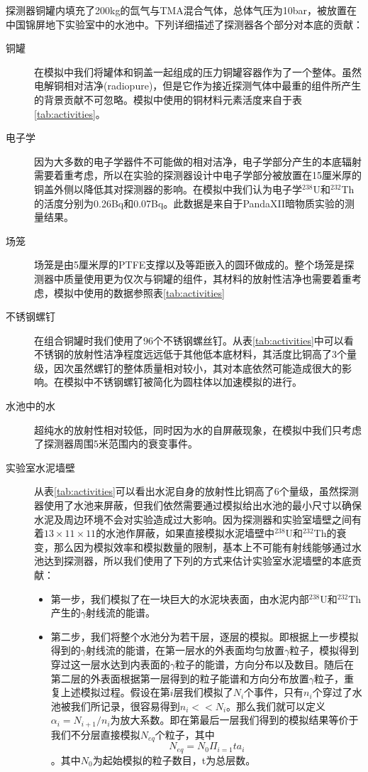 探测器铜罐内填充了200kg的氙气与TMA混合气体，总体气压为10bar，被放置在中国锦屏地下实验室中的水池中。下列详细描述了探测器各个部分对本底的贡献：

\begin{description}
    \item[铜罐] 在模拟中我们将罐体和铜盖一起组成的压力铜罐容器作为了一个整体。虽然电解铜相对洁净(radiopure)，但是它作为接近探测气体中最重的组件所产生的背景贡献不可忽略。模拟中使用的铜材料元素活度来自于表\ref{tab:activities}。
    \item[电子学] 因为大多数的电子学器件不可能做的相对洁净，电子学部分产生的本底辐射需要着重考虑，所以在实验的探测器设计中电子学部分被放置在15厘米厚的铜盖外侧以降低其对探测器的影响。在模拟中我们认为电子学$^{238}$U和$^{232}$Th的活度分别为0.26Bq和0.07Bq。此数据是来自于PandaXII暗物质实验的测量结果。
    \item[场笼]场笼是由5厘米厚的PTFE支撑以及等距嵌入的圆环做成的。整个场笼是探测器中质量使用更为仅次与铜罐的组件，其材料的放射性洁净也需要着重考虑，模拟中使用的数据参照表\ref{tab:activities}
    \item[不锈钢螺钉]在组合铜罐时我们使用了96个不锈钢螺丝钉。从表\ref{tab:activities}中可以看不锈钢的放射性洁净程度远远低于其他低本底材料，其活度比铜高了3个量级，因次虽然螺钉的整体质量相对较小，其对本底依然可能造成很大的影响。在模拟中不锈钢螺钉被简化为圆柱体以加速模拟的进行。
    \item[水池中的水]超纯水的放射性相对较低，同时因为水的自屏蔽现象，在模拟中我们只考虑了探测器周围5米范围内的衰变事件。
    \item[实验室水泥墙壁]从表\ref{tab:activities}可以看出水泥自身的放射性比铜高了6个量级，虽然探测器使用了水池来屏蔽，但我们依然需要通过模拟给出水池的最小尺寸以确保水泥及周边环境不会对实验造成过大影响。因为探测器和实验室墙壁之间有着$13\times11\times11$的水池作屏蔽，如果直接模拟水泥墙壁中$^{238}$U和$^{232}$Th的衰变，那么因为模拟效率和模拟数量的限制，基本上不可能有射线能够通过水池达到探测器，所以我们使用了下列的方式来估计实验室水泥墙壁的本底贡献：
    \begin{itemize}
        \item 第一步，我们模拟了在一块巨大的水泥块表面，由水泥内部$^{238}$U和$^{232}$Th产生的$\gamma$射线流的能谱。
        \item 第二步，我们将整个水池分为若干层，逐层的模拟。即根据上一步模拟得到的$\gamma$射线流的能谱，在第一层水的外表面均匀放置$\gamma$粒子，模拟得到穿过这一层水达到内表面的$\gamma$粒子的能谱，方向分布以及数目。随后在第二层的外表面根据第一层得到的粒子能谱和方向分布放置$\gamma$粒子，重复上述模拟过程。假设在第$i$层我们模拟了$N_i$个事件，只有$n_i$个穿过了水池被我们所记录，很容易得到$n_i<<N_i$。那么我们就可以定义$\alpha_i=N_{i+1}/n_i$为放大系数。即在第最后一层我们得到的模拟结果等价于我们不分层直接模拟$N_{eq}$个粒子，其中$$N_{eq}=N_0\Pi_{i=1}{t}a_i$$。其中$N_0$为起始模拟的粒子数目，t为总层数。

\end{itemize}
\end{description}
